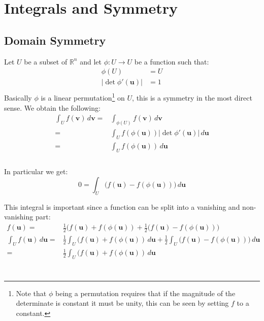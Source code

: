 
\section{Integrals and Symmetry}

\subsection{Domain Symmetry} 
Let $U$ be a subset of $\mathbb{R}^n$ and let $\phi: U \rightarrow U$ be a function such that:
\begin{equation*}
\begin{aligned}
	\phi(U) &= U \\
	|\det\phi'(\mathbf{u})| &= 1 \\
\end{aligned}
\end{equation*}
Basically $\phi$ is a linear permutation\footnote{
	Note that $\phi$ being a permutation requires that if the magnitude of the determinate is constant it must be unity, this can be seen by setting $f$ to a constant.
}
on $U$, this is a symmetry in the most direct sense.
We obtain the following:
\\
\begin{equation*}
\begin{aligned}
	\int_{U}f(\mathbf{v})\,d\mathbf{v} =& \int_{\phi(U)}f(\mathbf{v})\,d\mathbf{v} \\
	=& \int_Uf(\phi(\mathbf{u}))|\det\phi'(\mathbf{u})|\,d\mathbf{u} \\
	=& \int_Uf(\phi(\mathbf{u}))\,d\mathbf{u} \\
\end{aligned}
\end{equation*}
\\

In particular we get:
\[0=\int_{U}\big(f(\mathbf{u})-f(\phi(\mathbf{u}))\big)\,d\mathbf{u}\]

This integral is important since a function can be split into a vanishing and non-vanishing part:
\begin{equation*}
\begin{aligned}
	f(\mathbf{u}) =& \frac{1}{2}\big(f(\mathbf{u})+f(\phi(\mathbf{u}))+\frac{1}{2}\big(f(\mathbf{u})-f(\phi(\mathbf{u}))\big) \\
	\int_Uf(\mathbf{u})\,d\mathbf{u} =& \frac{1}{2}\int_U\big(f(\mathbf{u})+f(\phi(\mathbf{u}))\,d\mathbf{u}+\frac{1}{2}\int_U\big(f(\mathbf{u})-f(\phi(\mathbf{u}))\big)\,d\mathbf{u} \\
	=& \frac{1}{2}\int_U\big(f(\mathbf{u})+f(\phi(\mathbf{u}))\,d\mathbf{u}\\
\end{aligned}
\end{equation*}
\\

